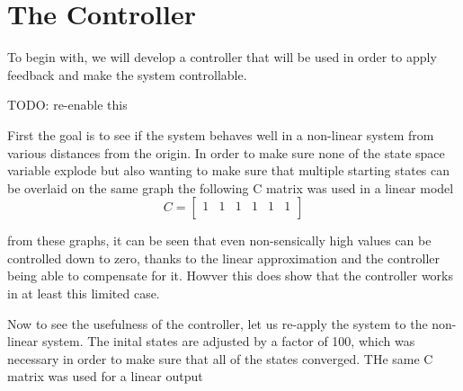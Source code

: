 \section{The Controller}
To begin with, we will develop a controller that will be used in order to apply feedback and make the system
controllable.

{\LARGE \color{red} TODO: re-enable this}

First the goal is to see if the system behaves well in a non-linear system from various distances from the
origin.
In order to make sure none of the state space variable explode but also wanting to make sure that multiple
starting states can be overlaid on the same graph the following C matrix was used in a linear model
\begin{equation}
  C =
  \begin{bmatrix}
    1 & 1 & 1 & 1 & 1 & 1 \\
  \end{bmatrix}
\end{equation}


from these graphs, it can be seen that even non-sensically high values can be controlled down to zero, thanks
to the linear approximation and the controller being able to compensate for it. Howver this does show that the
controller works in at least this limited case.

Now to see the usefulness of the controller, let us re-apply the system to the non-linear system. The inital
states are adjusted by a factor of 100, which was necessary in order to make sure that all of the states
converged. THe same C matrix was used for a linear output

